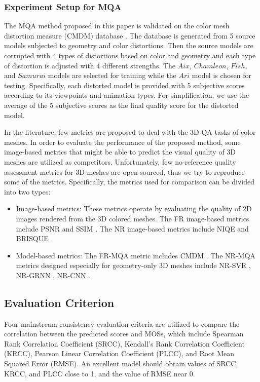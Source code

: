 \documentclass[lettersize,journal]{IEEEtran}
\begin{document}
\subsubsection{Experiment Setup for MQA}
The MQA method proposed in this paper is validated on the color mesh distortion measure (CMDM) database \cite{database}. The database is generated from 5 source models subjected to geometry and color distortions. Then the source models are corrupted with 4 types of distortions based on color and geometry and each type of distortion is adjusted with 4 different strengths. The $Aix$, $Chamleon$, $Fish$, and $Samurai$ models are selected for training while the $Ari$ model is chosen for testing. Specifically, each distorted model is provided with 5 subjective scores according to its viewpoints and animation types. For simplification, we use the average of the 5 subjective scores as the final quality score for the distorted model.

In the literature, few metrics are proposed to deal with the 3D-QA tasks of color meshes. In order to evaluate the performance of the proposed method, some image-based metrics that might be able to predict the visual quality of 3D meshes are utilized as competitors. Unfortunately, few no-reference quality assessment metrics for 3D meshes are open-sourced, thus we try to reproduce some of the metrics. Specifically, the metrics used for comparison can be divided into two types: 
\begin{itemize}
    \item  Image-based metrics: These metrics operate by evaluating the quality of 2D images rendered from the 3D colored meshes. The FR image-based metrics include PSNR and SSIM \cite{ssim}. The NR image-based metrics include NIQE \cite{niqe} and BRISQUE \cite{brisque}.
    \item Model-based metrics: The FR-MQA metric includes CMDM \cite{database}. The NR-MQA metrics designed especially for geometry-only 3D meshes include NR-SVR \cite{nr-svr}, NR-GRNN \cite{nr-grnn}, NR-CNN \cite{nr-cnn}.
\end{itemize}



\subsection{Evaluation Criterion}
Four mainstream consistency evaluation criteria are utilized to compare the correlation between the predicted scores and MOSs, which include Spearman Rank Correlation Coefficient (SRCC), Kendall’s Rank Correlation Coefficient (KRCC), Pearson Linear Correlation Coefficient (PLCC), and Root Mean Squared Error (RMSE).
An excellent model should obtain values of SRCC, KRCC, and PLCC close to 1, and the value of RMSE near 0. 
\end{document}
